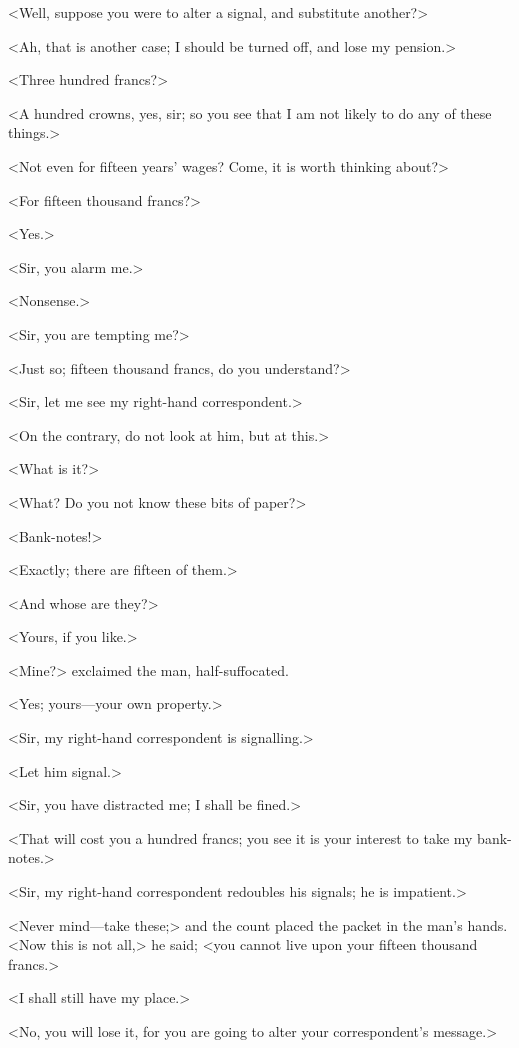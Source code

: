  <Well, suppose you were to alter a signal, and substitute another?> 

 <Ah, that is another case; I should be turned off, and lose my pension.> 

 <Three hundred francs?> 

 <A hundred crowns, yes, sir; so you see that I am not likely to do any of these things.> 

 <Not even for fifteen years' wages? Come, it is worth thinking about?> 

 <For fifteen thousand francs?> 

 <Yes.> 

 <Sir, you alarm me.> 

 <Nonsense.> 

 <Sir, you are tempting me?> 

 <Just so; fifteen thousand francs, do you understand?> 

 <Sir, let me see my right-hand correspondent.> 

 <On the contrary, do not look at him, but at this.> 

 <What is it?> 

 <What? Do you not know these bits of paper?> 

 <Bank-notes!> 

 <Exactly; there are fifteen of them.> 

 <And whose are they?> 

 <Yours, if you like.> 

 <Mine?> exclaimed the man, half-suffocated. 

 <Yes; yours—your own property.> 

 <Sir, my right-hand correspondent is signalling.> 

 <Let him signal.> 

 <Sir, you have distracted me; I shall be fined.> 

 <That will cost you a hundred francs; you see it is your interest to take my bank-notes.> 

 <Sir, my right-hand correspondent redoubles his signals; he is impatient.> 

 <Never mind—take these;> and the count placed the packet in the man's hands. <Now this is not all,> he said; <you cannot live upon your fifteen thousand francs.> 

 <I shall still have my place.> 

 <No, you will lose it, for you are going to alter your correspondent's message.> 

